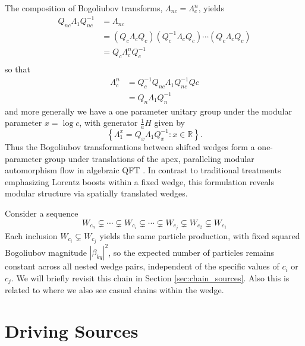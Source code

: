 \documentclass[12pt,a4paper]{article}
\begin{document}
The composition of Bogoliubov transforms, $\Lambda_{nc} = \Lambda_c^n$, yields
\begin{equation}
  \begin{array}{ll}    
    Q_{nc} \Lambda_1 Q_{nc}^{-1}  &= \Lambda_{nc} \\
         &= \left(Q_c \Lambda_{c} Q_c\right) \left( Q_c^{-1} \Lambda_{c} Q_c\right) \cdots \left(Q_c \Lambda_{c} Q_c\right) \\
  &= Q_c \Lambda_c^n Q_c^{-1} \\
  \end{array}
\end{equation}
so that
\begin{equation}
  \begin{array}{ll}
  \Lambda_c^n &= Q_c^{-1} Q_{nc} \Lambda_1 Q_{nc}^{-1} Q{c} \\
  &= Q_n \Lambda_1 Q_n^{-1}
  \end{array}
\end{equation}
and more generally we have a one parameter unitary group under the modular parameter $x = \log c$, with generator $\frac{1}{a} H$ given by
\begin{equation}
  \left\{\Lambda_1^x = Q_x \Lambda_1 Q_x^{-1} : x \in \mathbb{R} \right\}.
\end{equation}
Thus the Bogoliubov transformations between shifted wedges form a one-parameter group under translations of the apex, paralleling modular automorphism flow in algebraic QFT \cite{borchers2000revolutionizing}. In contrast to traditional treatments emphasizing Lorentz boosts within a fixed wedge, this formulation reveals modular structure via spatially translated wedges.

Consider a sequence
\begin{equation}
  W_{c_n} \subsetneq \cdots \subsetneq W_{c_i} \subsetneq \cdots \subsetneq W_{c_j} \subsetneq W_{c_2} \subsetneq W_{c_1}
  \label{chain}
\end{equation}
Each inclusion $W_{c_i} \subsetneq W_{c_j}$ yields the same particle production, with fixed squared Bogoliubov magnitude $|\beta_{kq}|^2$, so the expected number of particles remains constant across all nested wedge pairs, independent of the specific values of $c_i$ or $c_j$. We will briefly revisit this chain in Section \ref{sec:chain_sources}.  Also this is related to \cite{Svidzinsky2024MinkowskiVEA} where we also see casual chains within the wedge.

\section{Driving Sources} \label{sec:drive}
\end{document}
